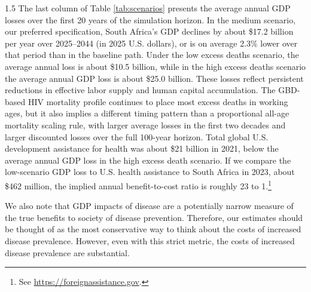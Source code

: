 \documentclass[letterpaper,12pt]{article}
\theoremstyle{definition}
\begin{document}
\begin{spacing}{1.5}
The last column of Table \ref{tab:scenarios} presents the average annual GDP losses over the first 20 years of the simulation horizon. In the medium scenario, our preferred specification, South Africa's GDP declines by about \$17.2 billion per year over 2025--2044 (in 2025 U.S. dollars), or is on average 2.3\% lower over that period than in the baseline path. Under the low excess deaths scenario, the average annual loss is about \$10.5 billion, while in the high excess deaths scenario the average annual GDP loss is about \$25.0 billion. These losses reflect persistent reductions in effective labor supply and human capital accumulation. The GBD-based HIV mortality profile continues to place most excess deaths in working ages, but it also implies a different timing pattern than a proportional all-age mortality scaling rule, with larger average losses in the first two decades and larger discounted losses over the full 100-year horizon. Total global U.S. development assistance for health was about \$21 billion in 2021, below the average annual GDP loss in the high excess death scenario. If we compare the low-scenario GDP loss to U.S. health assistance to South Africa in 2023, about \$462 million, the implied annual benefit-to-cost ratio is roughly 23 to 1.\footnote{See \href{https://foreignassistance.gov}{https://foreignassistance.gov}.}

We also note that GDP impacts of disease are a potentially narrow measure of the true benefits to society of disease prevention. Therefore, our estimates should be thought of as the most conservative way to think about the costs of increased disease prevalence. However, even with this strict metric, the costs of increased disease prevalence are substantial.


\end{spacing}
\end{document}
